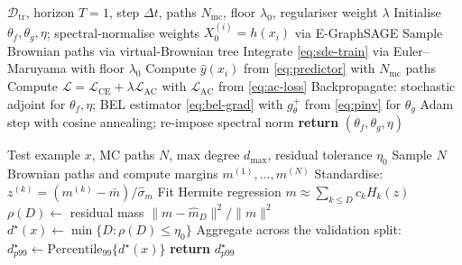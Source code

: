 \documentclass{ieeeaccess}
\newcommand{\Dcal}{\mathcal{D}}
\newcommand{\Lcal}{\mathcal{L}}
\newcommand{\pinv}{{+}}   %
\begin{document}
\begin{algorithm}[!t]
\caption{Stochastic ODE-Guard Training}
\label{alg:train}
\small
\begin{algorithmic}[1]
\REQUIRE $\Dcal_\mathrm{tr}$, horizon $T{=}1$, step $\Delta t$, paths
   $N_\mathrm{mc}$, floor $\lambda_0$, regulariser weight $\lambda$
\STATE Initialise $\theta_f,\theta_g,\eta$; spectral-normalise weights
  \FOR{mini-batch $\{(x_i,y_i)\}_{i=1}^B\sim\Dcal_\mathrm{tr}$}
    \STATE $X_0^{(i)}=h(x_i)$ via E-GraphSAGE
    \STATE Sample Brownian paths via virtual-Brownian tree
    \STATE Integrate \eqref{eq:sde-train} via Euler--Maruyama with
            floor $\lambda_0$
    \STATE Compute $\hat y(x_i)$ from \eqref{eq:predictor}
            with $N_\mathrm{mc}$ paths
    \STATE Compute $\Lcal=\Lcal_{\mathrm{CE}}+\lambda\Lcal_{\mathrm{AC}}$
            with $\Lcal_{\mathrm{AC}}$ from \eqref{eq:ac-loss}
    \STATE Backpropagate: stochastic adjoint for $\theta_f,\eta$;
            BEL estimator \eqref{eq:bel-grad} with $g_\theta^{\pinv}$
            from \eqref{eq:pinv} for $\theta_g$
    \STATE Adam step with cosine annealing; re-impose spectral norm
  \ENDFOR
\ENDFOR
\STATE \textbf{return} $(\theta_f,\theta_g,\eta)$
\end{algorithmic}
\end{algorithm}

\begin{algorithm}[!t]
\caption{Adaptive Chaos-Degree Estimator (inference-time)}
\label{alg:chaos}
\small
\begin{algorithmic}[1]
\REQUIRE Test example $x$, MC paths $N$, max degree $d_{\max}$,
         residual tolerance $\eta_0$
\STATE Sample $N$ Brownian paths and compute margins
       $m^{(1)},\dots,m^{(N)}$
\STATE Standardise: $z^{(k)}=(m^{(k)}-\bar m)/\hat\sigma_m$
  \STATE Fit Hermite regression $m \approx \sum_{k\leq D} c_k H_k(z)$
  \STATE $\rho(D)\leftarrow$ residual mass $\|m-\hat m_D\|^2/\|m\|^2$
\ENDFOR
\STATE $d^{\star}(x)\leftarrow\min\{D:\rho(D)\leq\eta_0\}$
\STATE Aggregate across the validation split:
       $d^\star_{p99}\leftarrow\mathrm{Percentile}_{99}\{d^\star(x)\}$
\STATE \textbf{return} $d^\star_{p99}$
\end{algorithmic}
\end{algorithm}

\end{document}

